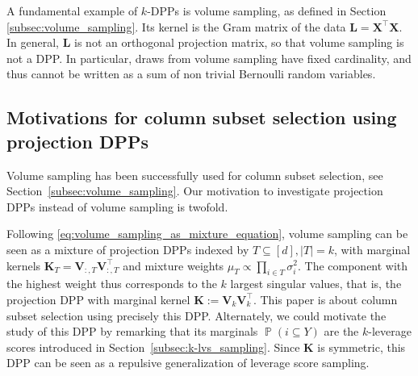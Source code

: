 \documentclass[twoside,11pt]{book}
\numberwithin{theorem}{chapter}
\numberwithin{definition}{chapter}
\numberwithin{proposition}{chapter}
\numberwithin{corollary}{chapter}
\numberwithin{example}{chapter}
\numberwithin{lemma}{chapter}
\DeclareMathOperator{\Det}{Det}
\DeclareMathOperator{\Tran}{\intercal}
\DeclareMathOperator{\Prb}{\mathbb{P}}
\begin{document}

A fundamental example of $k$-DPPs is volume sampling, as defined in Section \ref{subsec:volume_sampling}. Its kernel is the Gram matrix of the data $\bm{L} = \bm{X}^{\Tran}\bm{X}$. In general, $\bm{L}$ is not an orthogonal projection matrix, so that volume sampling is not a DPP. In particular, draws from volume sampling have fixed cardinality, and thus cannot be written as a sum of non trivial Bernoulli random variables.

\subsection{Motivations for column subset selection using projection DPPs}
Volume sampling has been successfully used for column subset selection, see Section~\ref{subsec:volume_sampling}. Our motivation to investigate projection DPPs instead of volume sampling is twofold.

Following \eqref{eq:volume_sampling_as_mixture_equation}, volume sampling can be seen as a mixture of projection DPPs indexed by $T\subseteq [d], \vert T\vert=k$, with marginal kernels $\bm{K}_{T} = \bm{V}^{}_{:,T}\bm{V}^{\Tran}_{:,T}$ and mixture weights $\mu_{T} \propto \prod_{i \in T} \sigma_{i}^{2}$. The component with the highest weight thus corresponds to the $k$ largest singular values, that is, the projection DPP with marginal kernel
$\bm K:=\bm{V}^{}_{k}\bm{V}_{k}^{\Tran}$. This paper is about column subset selection using precisely this DPP. Alternately, we could motivate the study of this DPP by remarking that its marginals $\Prb({i}\subseteq Y)$ are the $k$-leverage scores introduced in Section~\ref{subsec:k-lvs_sampling}. Since $\bm K$ is symmetric, this DPP can be seen as a repulsive generalization of leverage score sampling.
\end{document}
